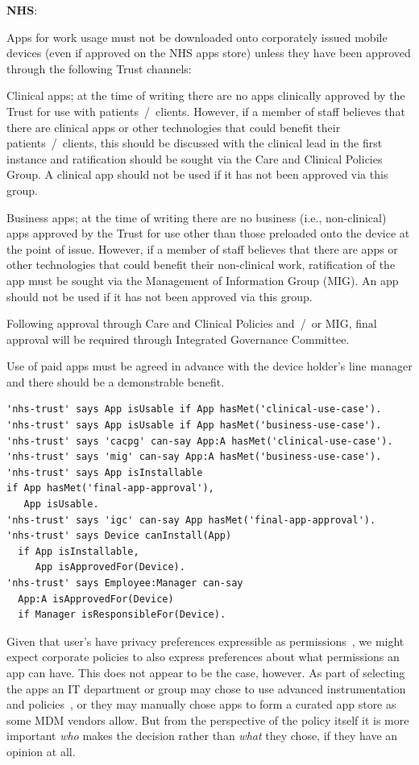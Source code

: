 \documentclass{llncs}
\newenvironment{policyrule}[1]{%
  \begin{mdframed}\footnotesize
      \noindent\textbf{\sffamily #1}:~\itshape%
}{%
  \end{mdframed}
}
\begin{document}
\begin{policyrule}{NHS}
  Apps for work usage must not be downloaded onto corporately issued
  mobile devices (even if approved on the NHS apps store) unless they have
  been approved through the following Trust channels:
  
  Clinical apps; at the time of writing there are no apps clinically
  approved by the Trust for use with patients~/~clients. However, if a
  member of staff believes that there are clinical apps or other
  technologies that could benefit their patients~/~clients, this should be
  discussed with the clinical lead in the first instance and ratification
  should be sought via the Care and Clinical Policies Group. A clinical
  app should not be used if it has not been approved via this group.
  
  Business apps; at the time of writing there are no business (i.e.,
  non-clinical) apps approved by the Trust for use other than those
  preloaded onto the device at the point of issue. However, if a member of
  staff believes that there are apps or other technologies that could
  benefit their non-clinical work, ratification of the app must be sought
  via the Management of Information Group (MIG). An app should not be used
  if it has not been approved via this group.

  Following approval through Care and Clinical Policies and~/~or MIG, final
  approval will be required through Integrated Governance Committee.

  Use of paid apps must be agreed in advance with the device holder's line
  manager and there should be a demonstrable benefit.
  \normalfont
  \begin{lstlisting}
'nhs-trust' says App isUsable if App hasMet('clinical-use-case').
'nhs-trust' says App isUsable if App hasMet('business-use-case').
'nhs-trust' says 'cacpg' can-say App:A hasMet('clinical-use-case').
'nhs-trust' says 'mig' can-say App:A hasMet('business-use-case').
'nhs-trust' says App isInstallable
if App hasMet('final-app-approval'),
   App isUsable.
'nhs-trust' says 'igc' can-say App hasMet('final-app-approval').
'nhs-trust' says Device canInstall(App)
  if App isInstallable,
     App isApprovedFor(Device).
'nhs-trust' says Employee:Manager can-say
  App:A isApprovedFor(Device)
  if Manager isResponsibleFor(Device).
  \end{lstlisting}
\end{policyrule}
Given that user's have privacy preferences expressible as permissions~\cite{lin_modeling_2014}, we might expect corporate policies to also express preferences about what permissions an app can have.
This does not appear to be the case, however. 
As part of selecting the apps an IT department or group may chose to use advanced instrumentation and policies~\cite{armando_enabling_2014}, or they may manually chose apps to form a curated app store as some \ac{MDM} vendors allow.
But from the perspective of the policy itself it is more important \emph{who} makes the decision rather than \emph{what} they chose, if they have an opinion at all.
\end{document}
